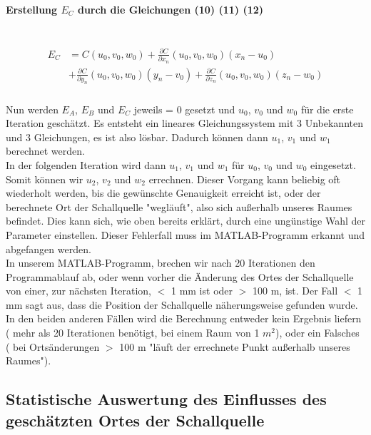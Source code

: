 \paragraph{Erstellung $E_{C}$ durch die Gleichungen (10) (11) (12)} \ \\
\begin{align}
\begin{split}
E_{C} &= C(u_{0},v_{0},w_{0}) + \frac{\partial C}{\partial x_{n}}(u_{0},v_{0},w_{0})(x_{n} - u_{0}) \\ &+ \frac{\partial C}{\partial y_{n}}(u_{0},v_{0},w_{0})(y_{n} - v_{0}) + \frac{\partial C}{\partial z_{n}}(u_{0},v_{0},w_{0})(z_{n} - w_{0})
\end{split}
\end{align} \ \\


Nun werden $E_{A}$, $E_{B}$ und $E_{C}$ jeweils = 0 gesetzt und $u_{0}$, $v_{0}$ und $w_{0}$ für die erste Iteration geschätzt. Es entsteht ein lineares Gleichungssystem mit 3 Unbekannten und 3 Gleichungen, es ist also lösbar. Dadurch können dann $u_{1}$, $v_{1}$ und $w_{1}$ berechnet werden.\\ 
In der folgenden Iteration wird dann $u_{1}$, $v_{1}$ und $w_{1}$ für $u_{0}$, $v_{0}$ und $w_{0}$ eingesetzt. Somit können wir $u_{2}$, $v_{2}$ und $w_{2}$ errechnen. Dieser Vorgang kann beliebig oft wiederholt werden, bis die gewünschte Genauigkeit erreicht ist, oder der berechnete Ort der Schallquelle "wegläuft", also sich außerhalb unseres Raumes befindet. Dies kann sich, wie oben bereits erklärt, durch eine ungünstige Wahl der Parameter einstellen. Dieser Fehlerfall muss im MATLAB-Programm erkannt und abgefangen werden. \\

In unserem MATLAB-Programm, brechen wir nach 20 Iterationen den Programmablauf ab, oder wenn vorher die Änderung des Ortes der Schallquelle von einer, zur nächsten Iteration, $<$ 1 mm ist oder $>$ 100 m, ist. Der Fall $<$ 1 mm sagt aus, dass die Position der Schallquelle näherungsweise gefunden wurde. In den beiden anderen Fällen wird die Berechnung entweder kein Ergebnis liefern ( mehr als 20 Iterationen benötigt, bei einem Raum von 1 $m^{2}$), oder ein Falsches ( bei Ortsänderungen $>$ 100 m "läuft der errechnete Punkt außerhalb unseres Raumes").

\subsection{Statistische Auswertung des Einflusses des geschätzten Ortes der Schallquelle}
